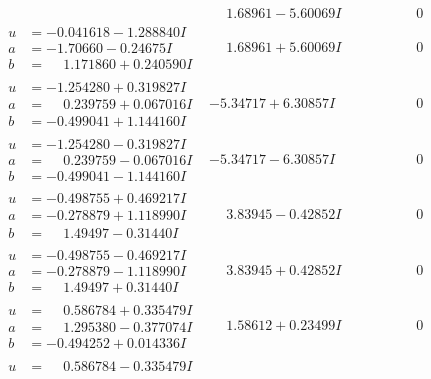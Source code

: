 \documentclass[1p]{elsarticle_modified}
\theoremstyle{definition}
\begin{document}
$$\begin{array}{c|c|c}
 & \phantom{-}1.68961 - 5.60069 I & \phantom{-0.000000 } 0 \\ \hline\begin{aligned}
u &= -0.041618 - 1.288840 I \\
a &= -1.70660 - 0.24675 I \\
b &= \phantom{-}1.171860 + 0.240590 I\end{aligned}
 & \phantom{-}1.68961 + 5.60069 I & \phantom{-0.000000 } 0 \\ \hline\begin{aligned}
u &= -1.254280 + 0.319827 I \\
a &= \phantom{-}0.239759 + 0.067016 I \\
b &= -0.499041 + 1.144160 I\end{aligned}
 & -5.34717 + 6.30857 I & \phantom{-0.000000 } 0 \\ \hline\begin{aligned}
u &= -1.254280 - 0.319827 I \\
a &= \phantom{-}0.239759 - 0.067016 I \\
b &= -0.499041 - 1.144160 I\end{aligned}
 & -5.34717 - 6.30857 I & \phantom{-0.000000 } 0 \\ \hline\begin{aligned}
u &= -0.498755 + 0.469217 I \\
a &= -0.278879 + 1.118990 I \\
b &= \phantom{-}1.49497 - 0.31440 I\end{aligned}
 & \phantom{-}3.83945 - 0.42852 I & \phantom{-0.000000 } 0 \\ \hline\begin{aligned}
u &= -0.498755 - 0.469217 I \\
a &= -0.278879 - 1.118990 I \\
b &= \phantom{-}1.49497 + 0.31440 I\end{aligned}
 & \phantom{-}3.83945 + 0.42852 I & \phantom{-0.000000 } 0 \\ \hline\begin{aligned}
u &= \phantom{-}0.586784 + 0.335479 I \\
a &= \phantom{-}1.295380 - 0.377074 I \\
b &= -0.494252 + 0.014336 I\end{aligned}
 & \phantom{-}1.58612 + 0.23499 I & \phantom{-0.000000 } 0 \\ \hline\begin{aligned}
u &= \phantom{-}0.586784 - 0.335479 I \\

\end{aligned}
\end{array}$$
\end{document}

